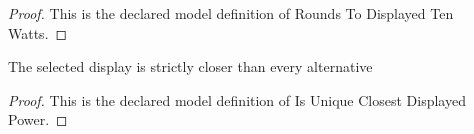 \begin{proof}
  This is the declared model definition of Rounds To Displayed Ten Watts.
\end{proof}
\begin{definition}
  \label{def:physics:phyx-mini-0481:phyxminiproblems-problemphyxmini0481-isuniqueclosestdisplayedpower}
  The selected display is strictly closer than every alternative
\end{definition}
\begin{proof}
  This is the declared model definition of Is Unique Closest Displayed Power.
\end{proof}
